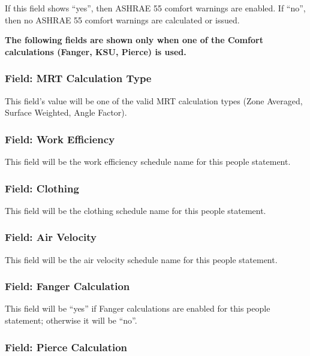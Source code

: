If this field shows ``yes'', then ASHRAE 55 comfort warnings are enabled. If ``no'', then no ASHRAE 55 comfort warnings are calculated or issued.

\textbf{The following fields are shown only when one of the Comfort calculations (Fanger, KSU, Pierce) is used.}

\subsubsection{Field: MRT Calculation Type}\label{field-mrt-calculation-type}

This field's value will be one of the valid MRT calculation types (Zone Averaged, Surface Weighted, Angle Factor).

\subsubsection{Field: Work Efficiency}\label{field-work-efficiency}

This field will be the work efficiency schedule name for this people statement.

\subsubsection{Field: Clothing}\label{field-clothing}

This field will be the clothing schedule name for this people statement.

\subsubsection{Field: Air Velocity}\label{field-air-velocity}

This field will be the air velocity schedule name for this people statement.

\subsubsection{Field: Fanger Calculation}\label{field-fanger-calculation}

This field will be ``yes'' if Fanger calculations are enabled for this people statement; otherwise it will be ``no''.

\subsubsection{Field: Pierce Calculation}\label{field-pierce-calculation}

